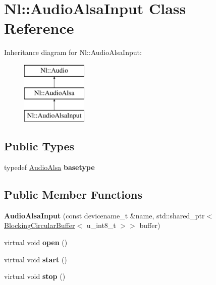\hypertarget{classNl_1_1AudioAlsaInput}{}\section{Nl\+:\+:Audio\+Alsa\+Input Class Reference}
\label{classNl_1_1AudioAlsaInput}
Inheritance diagram for Nl\+:\+:Audio\+Alsa\+Input\+:\begin{figure}[H]
\begin{center}
\leavevmode
\includegraphics[height=3.000000cm]{classNl_1_1AudioAlsaInput}
\end{center}
\end{figure}
\subsection*{Public Types}
\begin{DoxyCompactItemize}
\item 
\hypertarget{classNl_1_1AudioAlsaInput_ac39e7e54c4aaaaa5c294c95cda6e3d87}{}typedef \hyperlink{classNl_1_1AudioAlsa}{Audio\+Alsa} {\bfseries basetype}\label{classNl_1_1AudioAlsaInput_ac39e7e54c4aaaaa5c294c95cda6e3d87}

\end{DoxyCompactItemize}
\subsection*{Public Member Functions}
\begin{DoxyCompactItemize}
\item 
\hypertarget{classNl_1_1AudioAlsaInput_a31600b01d3b544daba1925bb130e1301}{}{\bfseries Audio\+Alsa\+Input} (const devicename\+\_\+t \&name, std\+::shared\+\_\+ptr$<$ \hyperlink{classNl_1_1BlockingCircularBuffer}{Blocking\+Circular\+Buffer}$<$ u\+\_\+int8\+\_\+t $>$$>$ buffer)\label{classNl_1_1AudioAlsaInput_a31600b01d3b544daba1925bb130e1301}

\item 
\hypertarget{classNl_1_1AudioAlsaInput_a9e3afb8dfb0615d745a4f362302ce99d}{}virtual void {\bfseries open} ()\label{classNl_1_1AudioAlsaInput_a9e3afb8dfb0615d745a4f362302ce99d}

\item 
\hypertarget{classNl_1_1AudioAlsaInput_a9b8aa604c6e78b93b337ae68cb071e00}{}virtual void {\bfseries start} ()\label{classNl_1_1AudioAlsaInput_a9b8aa604c6e78b93b337ae68cb071e00}

\item 
\hypertarget{classNl_1_1AudioAlsaInput_a728ce3af74d71e387834a28922fc98c1}{}virtual void {\bfseries stop} ()\label{classNl_1_1AudioAlsaInput_a728ce3af74d71e387834a28922fc98c1}

\end{DoxyCompactItemize}
